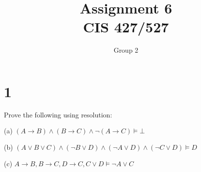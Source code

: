 \documentclass[10pt]{article}
\begin{document}
\title{Assignment \raisebox{.22ex}{\large\#}6 \\
	CIS 427/527}
\author{Group 2}

\maketitle

\section*{1}
Prove the following using resolution:

\begin{description*}
\item[(a)] $(A\to B)\land (B\to C)\land \lnot(A\to C)\models \bot$
\item[(b)] $(A\lor B\lor C)\land (\lnot B\lor D)\land (\lnot A\lor D)\land (\lnot C \lor D) \models D$
\item[(c)] $A\to B, B\to C, D\to C, C\lor D \models \lnot A \lor C$
\end{description*}
\end{document}
